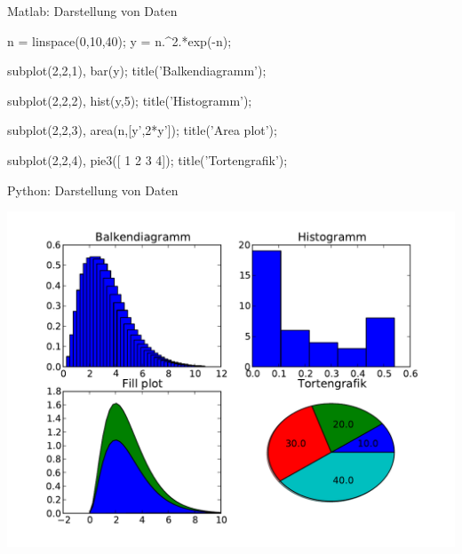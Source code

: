 \documentclass[hyperref={xetex}]{beamer}
\begin{document}
% 
% 
\begin{frame}[fragile]{Matlab: Darstellung von Daten}
\begin{matlabin}
n = linspace(0,10,40);
y = n.^2.*exp(-n);

subplot(2,2,1),
bar(y); title('Balkendiagramm');

subplot(2,2,2),
hist(y,5); title('Histogramm');

subplot(2,2,3),
area(n,[y',2*y']); title('Area plot');

subplot(2,2,4),
pie3([ 1 2 3 4]); title('Tortengrafik');
\end{matlabin}
\end{frame}
% 
% 
\begin{frame}[fragile]{Python: Darstellung von Daten}
\begin{center}\includegraphics[height=0.8\textheight]{figures/darstellung_daten_2d_py}\end{center}
\end{frame}
\end{document}
